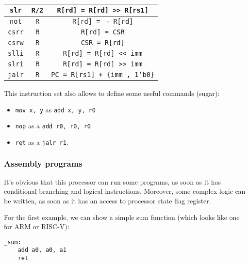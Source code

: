 \documentclass[a4paper]{article}
\begin{document}
\begin{table}[!h]
\begin{tabular}{c c c}
\multicolumn{1}{|c|}{\texttt{slr}} & \texttt{R/2} & \multicolumn{1}{|c|}{\texttt{R[rd] = R[rd] >> R[rs1]}}\\ \hline \hline

\multicolumn{1}{|c|}{\texttt{not}} & \texttt{R} & \multicolumn{1}{|c|}{\texttt{R[rd] = $\neg$ R[rd]}}\\ \hline

\multicolumn{1}{|c|}{\texttt{csrr}} & \texttt{R} & \multicolumn{1}{|c|}{\texttt{R[rd] = CSR}}\\ \hline

\multicolumn{1}{|c|}{\texttt{csrw}} & \texttt{R} & \multicolumn{1}{|c|}{\texttt{CSR = R[rd]}}\\ \hline

\multicolumn{1}{|c|}{\texttt{slli}} & \texttt{R} & \multicolumn{1}{|c|}{\texttt{R[rd] = R[rd] << imm}}\\ \hline

\multicolumn{1}{|c|}{\texttt{slri}} & \texttt{R} & \multicolumn{1}{|c|}{\texttt{R[rd] = R[rd] >> imm}}\\ \hline \hline

\multicolumn{1}{|c|}{\texttt{jalr}} & \texttt{R} & \multicolumn{1}{|c|}{\texttt{PC = R[rs1] + \{imm , 1'b0\}}}\\ \hline
\end{tabular}
\end{table}

This instruction set also allows to define some useful commands (sugar):

\begin{itemize}
    \item \texttt{mov x, y} as \texttt{add x, y, r0}
    \item \texttt{nop} as a \texttt{add r0, r0, r0}
    \item \texttt{ret} as a \texttt{jalr r1}.
\end{itemize}

\newpage
\subsubsection{Assembly programs}

It's obvious that this processor can run some programs, as soon as it has conditional branching and logical instructions.
Moreover, some complex logic can be written, as soon as it has an access to processor state flag register.

For the first example, we can show a simple sum function (which looks like one for ARM or RISC-V):
\begin{lstlisting}[language={[x86masm]Assembler}, caption=Sum function]
_sum:
    add a0, a0, a1
    ret
   
\end{lstlisting}
\end{document}
